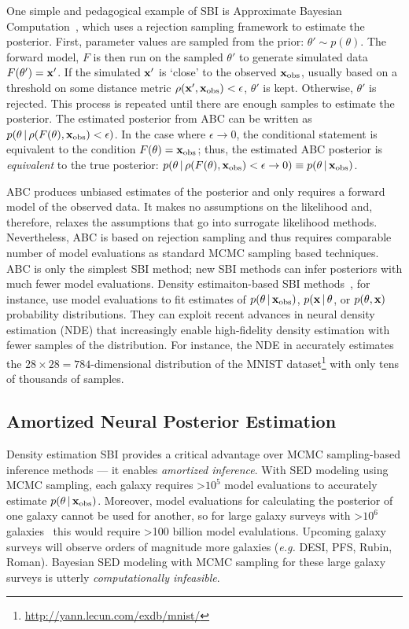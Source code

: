 One simple and pedagogical example of SBI is Approximate Bayesian
Computation~\citep[ABC;][]{rubin1984, pritchard1999, beaumont2002}, which uses
a rejection sampling framework to estimate the posterior. 
First, parameter values are sampled from the prior: $\theta'\sim p(\theta)$. 
The forward model, $F$ is then run on the sampled $\theta'$ to generate
simulated data $F(\theta') = {\bf x}'$.
If the simulated ${\bf x}'$ is `close' to the observed ${\bf x}_{\rm obs}$, usually based
on a threshold on some distance metric $\rho({\bf x}', {\bf x}_{\rm obs}) < \epsilon$, 
$\theta'$ is kept. 
Otherwise, $\theta'$ is rejected. 
This process is repeated until there are enough samples to estimate the
posterior. 
The estimated posterior from ABC can be written as 
$p(\theta \,|\, \rho(F(\theta), {\bf x}_{\rm obs}) < \epsilon)$. 
In the case where $\epsilon\rightarrow 0$, the conditional statement is
equivalent to the condition $F(\theta) = {\bf x}_{\rm obs}$; thus, the estimated ABC
posterior is {\em equivalent} to the true posterior:
$p(\theta \,|\, \rho(F(\theta), {\bf x}_{\rm obs}) < \epsilon\rightarrow 0) \equiv
p(\theta \,|\, {\bf x}_{\rm obs})$.

ABC produces unbiased estimates of the posterior and only requires a forward
model of the observed data.
It makes no assumptions on the likelihood and, therefore, relaxes the
assumptions that go into surrogate likelihood methods. 
Nevertheless, ABC is based on rejection sampling and thus requires comparable
number of model evaluations as standard MCMC sampling based techniques. 
ABC is only the simplest SBI method; new SBI methods can infer posteriors with
much fewer model evaluations.
Density estimaiton-based SBI methods~\citep[\eg][]{papamakarios2017,
alsing2018, hahn2019c, greenberg2019, tejero-cantero2020}, for instance, use
model evaluations to fit estimates of $p(\theta\,|\,{\bf x}_{\rm obs})$, $p({\bf
x}\,|\, \theta$, or $p(\theta, {\bf x})$ probability distributions.  
They can exploit recent advances in neural density estimation (NDE) that
increasingly enable high-fidelity density estimation with fewer samples of the
distribution.
For instance, the NDE in \cite{papamakarios2017} accurately estimates the
$28\times28=784$-dimensional distribution of the MNIST
dataset\footnote{\url{http://yann.lecun.com/exdb/mnist/}} with only tens of
thousands of samples. 

\subsection{Amortized Neural Posterior Estimation} \label{sec:flow}
Density estimation SBI provides a critical advantage over MCMC sampling-based
inference methods --- it enables \emph{amortized inference}. 
With SED modeling using MCMC sampling, each galaxy requires >$10^5$ model
evaluations to accurately estimate $p(\theta \,|\, {\bf x}_{\rm obs})$. 
Moreover, model evaluations for calculating the posterior of one galaxy cannot
be used for another, so for large galaxy surveys with >$10^6$
galaxies~\citep[\emph{e.g.}][]{ahumada2020} this would require >100 billion
model evalulations.
Upcoming galaxy surveys will observe orders of magnitude more galaxies
(\emph{e.g.} DESI, PFS, Rubin, Roman).
Bayesian SED modeling with MCMC sampling for these large galaxy surveys is
utterly \emph{computationally infeasible}.

